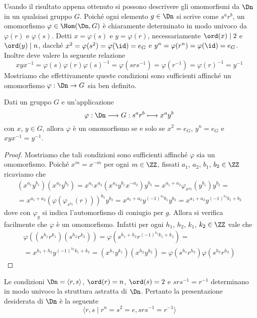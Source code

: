 \documentclass[11pt]{scrartcl}
\begin{document}
	Usando il risultato appena ottenuto si possono descrivere gli omomorfismi da $\Dn$ in 
	un qualsiasi gruppo $G$. Poiché ogni elemento $g \in \Dn$ si scrive come
	$s^ar^b$, un omomorfismo $\varphi \in \Hom(\Dn, G)$ è chiaramente
	determinato in modo univoco da $\varphi(r)$ e $\varphi(s)$. Detti $x = \varphi(s)$
	e $y = \varphi(r)$, necessariamente $\ord(x) \mid 2$
	e $\ord(y)\mid n$, dacché $x^2 = \varphi(s^2) = \varphi(\id) = e_G$ e
	$y^n = \varphi(r^n) = \varphi(\id) = e_G$. Inoltre deve valere la seguente relazione
	\[
	xyx^{-1} = \varphi(s)\varphi(r)\varphi(s)^{-1} = \varphi(srs^{-1}) = 
	\varphi(r^{-1}) = \varphi(r)^{-1} = y^{-1}
	\]Mostriamo che effettivamente queste condizioni sono sufficienti affinché un
	omomorfismo $\varphi : \Dn \to G$ sia ben definito.
	
	\begin{proposition}
		Dati un gruppo $G$ e un'applicazione
		\[
		\varphi: \Dn \longrightarrow G :s^ar^b \longmapsto x^ay^b
		\] con $x$, $y \in G$, allora $\varphi$ è un omomorfismo
		se e solo se $x^2 = e_G$, $y^n = e_G$ e $xyx^{-1} = y^{-1}$.
	\end{proposition}
	
	\begin{proof}
		Mostriamo che tali condizioni sono sufficienti affinché $\varphi$ sia un 
		omomorfismo. Poiché $x^m = x^{-m}$ per ogni $m \in \ZZ$, fissati 
		$a_1$, $a_2$, $b_1$, $b_2 \in \ZZ$ ricaviamo che 
		\begin{multline*}
			(x^{a_1}y^{b_1})(x^{a_2}y^{b_2}) = x^{a_1}x^{a_2}(x^{a_2}y^{b_1}x^{-a_2})y^{b_2} = 
			x^{a_1 + a_2}\varphi_{x^{a_2}}(y^{b_1})y^{b_2} = \\
			= x^{a_1 + a_2} (\varphi(\varphi_{s^{a_2}}(r)))^{b_1}y^{b_2} =
			x^{a_1 + a_2}y^{(-1)^{a_2}b_1}y^{b_2} = x^{a_1 + a_2}y^{(-1)^{a_2}b_1 + b_2}
		\end{multline*} dove con $\varphi_g$ si indica l'automorfismo di coniugio per $g$.
		Allora si verifica facilmente che $\varphi$ è un omomorfismo. Infatti per ogni $h_1$, $h_2$, $k_1$, $k_2 \in \ZZ$ vale che
		\begin{multline*}
			\varphi((s^{h_1}r^{k_1})(s^{h_2}r^{k_2})) = \varphi(s^{h_1 + h_2}r^{(-1)^{h_2}k_1 + k_2}) =\\
			= x^{h_1 + h_2}y^{(-1)^{h_2}k_1 + k_2} = (x^{h_1}y^{k_1})(x^{h_2}y^{k_2}) = 
			\varphi(s^{h_1}r^{h_2})\varphi(s^{h_2}r^{h_2})
		\end{multline*}
	\end{proof}
	
	\begin{remark}
		Le condizioni $\Dn = \langle r, s\rangle$, $\ord(r) = n$,
		$\ord(s) = 2$ e $srs^{-1} = r^{-1}$ determinano in modo univoco 
		la struttura astratta di $\Dn$. Pertanto la presentazione desiderata
		di $\Dn$ è la seguente
		\[
		\langle r, s\mid r^n = s^2 = e, srs^{-1} = r^{-1}\rangle
		\]
	\end{remark}	
	
\end{document}
